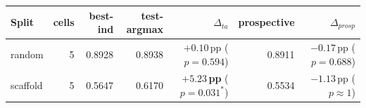 \begin{tabular}{lrrrrrr}
\toprule
Split & cells & best-ind & test-argmax & $\Delta_{ta}$ & prospective & $\Delta_{prosp}$ \\
\midrule
random & 5 & 0.8928 & 0.8938 & $+0.10$\,pp ($p\!=\!0.594$) & 0.8911 & $-0.17$\,pp ($p\!=\!0.688$) \\
scaffold & 5 & 0.5647 & 0.6170 & $\mathbf{+5.23}$\,\textbf{pp} ($p\!=\!\mathbf{0.031^{*}}$) & 0.5534 & $-1.13$\,pp ($p\!\approx\!1$) \\
\bottomrule
\end{tabular}

